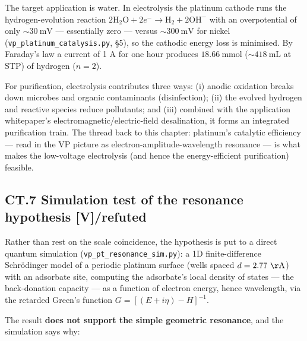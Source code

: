 \documentclass[
  10pt,
]{article}
\begin{document}
The target application is water. In electrolysis the platinum cathode
runs the hydrogen-evolution reaction
\(2\mathrm H_2\mathrm O + 2e^- \to \mathrm H_2 + 2\mathrm{OH}^-\) with
an overpotential of only \(\sim 30\ \mathrm{mV}\) --- essentially zero
--- versus \(\sim 300\ \mathrm{mV}\) for nickel
(\texttt{vp\_platinum\_catalysis.py}, §5), so the cathodic energy loss
is minimised. By Faraday's law a current of 1 A for one hour produces
\(18.66\ \mathrm{mmol}\) (\(\sim 418\ \mathrm{mL}\) at STP) of hydrogen
(\(n = 2\)).

For purification, electrolysis contributes three ways: (i) anodic
oxidation breaks down microbes and organic contaminants (disinfection);
(ii) the evolved hydrogen and reactive species reduce pollutants; and
(iii) combined with the application whitepaper's
electromagnetic/electric-field desalination, it forms an integrated
purification train. The thread back to this chapter: platinum's
catalytic efficiency --- read in the VP picture as
electron-amplitude-wavelength resonance --- is what makes the
low-voltage electrolysis (and hence the energy-efficient purification)
feasible.

\hypertarget{ct.7-simulation-test-of-the-resonance-hypothesis-vrefuted}{%
\subsection{\texorpdfstring{CT.7 Simulation test of the resonance
hypothesis
\textbf{{[}V{]}/refuted}}{CT.7 Simulation test of the resonance hypothesis {[}V{]}/refuted}}\label{ct.7-simulation-test-of-the-resonance-hypothesis-vrefuted}}

Rather than rest on the scale coincidence, the hypothesis is put to a
direct quantum simulation (\texttt{vp\_pt\_resonance\_sim.py}): a 1D
finite-difference Schrödinger model of a periodic platinum surface
(wells spaced \(d = 2.77\ \mathrm{\AA}\)) with an adsorbate site,
computing the adsorbate's local density of states --- the back-donation
capacity --- as a function of electron energy, hence wavelength, via the
retarded Green's function \(G = [(E+i\eta) - H]^{-1}\).

The result \textbf{does not support the simple geometric resonance}, and
the simulation says why:
\end{document}
